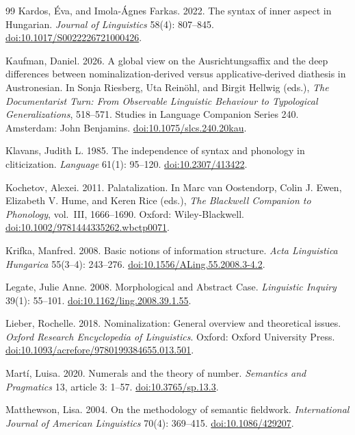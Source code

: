 \begin{thebibliography}{99}
Kardos, \'Eva, and Imola-\'Agnes Farkas. 2022.
The syntax of inner aspect in Hungarian.
\textit{Journal of Linguistics} 58(4): 807--845.
\href{https://doi.org/10.1017/S0022226721000426}{doi:10.1017/S0022226721000426}.

Kaufman, Daniel. 2026.
A global view on the Ausrichtungsaffix and the deep differences between
nominalization-derived versus applicative-derived diathesis in Austronesian.
In Sonja Riesberg, Uta Rein\"ohl, and Birgit Hellwig (eds.),
\textit{The Documentarist Turn: From Observable Linguistic Behaviour to
Typological Generalizations}, 518--571.
Studies in Language Companion Series 240. Amsterdam: John Benjamins.
\href{https://doi.org/10.1075/slcs.240.20kau}{doi:10.1075/slcs.240.20kau}.

Klavans, Judith L. 1985.
The independence of syntax and phonology in cliticization.
\textit{Language} 61(1): 95--120.
\href{https://doi.org/10.2307/413422}{doi:10.2307/413422}.

Kochetov, Alexei. 2011.
Palatalization.
In Marc van Oostendorp, Colin J. Ewen, Elizabeth V. Hume, and Keren Rice (eds.),
\textit{The Blackwell Companion to Phonology}, vol.~III, 1666--1690.
Oxford: Wiley-Blackwell.
\href{https://doi.org/10.1002/9781444335262.wbctp0071}{doi:10.1002/9781444335262.wbctp0071}.

Krifka, Manfred. 2008.
Basic notions of information structure.
\textit{Acta Linguistica Hungarica} 55(3--4): 243--276.
\href{https://doi.org/10.1556/ALing.55.2008.3-4.2}{doi:10.1556/ALing.55.2008.3-4.2}.

Legate, Julie Anne. 2008.
Morphological and Abstract Case.
\textit{Linguistic Inquiry} 39(1): 55--101.
\href{https://doi.org/10.1162/ling.2008.39.1.55}{doi:10.1162/ling.2008.39.1.55}.

Lieber, Rochelle. 2018.
Nominalization: General overview and theoretical issues.
\textit{Oxford Research Encyclopedia of Linguistics}.
Oxford: Oxford University Press.
\href{https://doi.org/10.1093/acrefore/9780199384655.013.501}{doi:10.1093/acrefore/9780199384655.013.501}.

Martí, Luisa. 2020.
Numerals and the theory of number.
\textit{Semantics and Pragmatics} 13, article 3: 1--57.
\href{https://doi.org/10.3765/sp.13.3}{doi:10.3765/sp.13.3}.

Matthewson, Lisa. 2004.
On the methodology of semantic fieldwork.
\textit{International Journal of American Linguistics} 70(4): 369--415.
\href{https://doi.org/10.1086/429207}{doi:10.1086/429207}.


\end{thebibliography}
